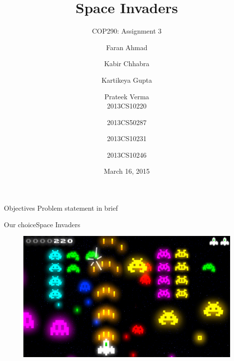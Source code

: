 \documentclass{beamer}
\title[COP 290]{Space Invaders}
\subtitle{COP290: Assignment 3}
\author[Faran \and Kabir \and Kartikeya \and Prateek]{Faran Ahmad \and Kabir Chhabra \and Kartikeya Gupta \and Prateek Verma \\
  2013CS10220 \and 2013CS50287 \and 2013CS10231 \and 2013CS10246}
\institute[IITD] %
{
  Department of Computer Science and Engineering\\
  IIT Delhi
}
\date{March 16, 2015}
\begin{document}
\begin{frame}
  \titlepage
\end{frame}



\begin{frame}{Objectives}{}
  Problem statement in brief
\end{frame}

\begin{frame}{Our choice}{Space Invaders}
    \begin{figure}[ht!]
      \centering
          \includegraphics[width=1.0\linewidth]{gameplay.png}
    \end{figure}
\end{frame}
\end{document}
